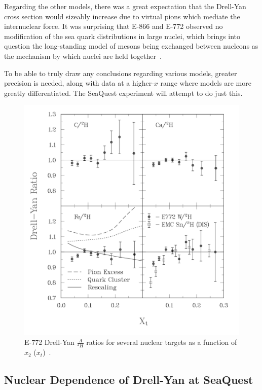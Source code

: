 Regarding the other models, there was a great expectation that the Drell-Yan cross section would sizeably increase due to virtual pions which mediate the internuclear force. It was surprising that E-866 and E-772 observed no modification of the sea quark distributions in large nuclei, which brings into question the long-standing model of mesons being exchanged between nucleons as the mechanism by which nuclei are held together~\cite{Carlson:1997qn}.

To be able to truly draw any conclusions regarding various models, greater precision is needed, along with data at a higher-$x$ range where models are more greatly differentiated. The SeaQuest experiment will attempt to do just this.

\begin{figure}
	\centering
	\includegraphics[width=\textwidth]{figures/background/dyfig9.png}
	\caption{E-772 Drell-Yan $\frac{A}{^2H}$ ratios for several nuclear targets as a function of $x_2$ ($x_t$)~\cite{PhysRevLett.64.2479}.}
	\label{fig:772-dy}
\end{figure}

\subsection{Nuclear Dependence of Drell-Yan at SeaQuest}

